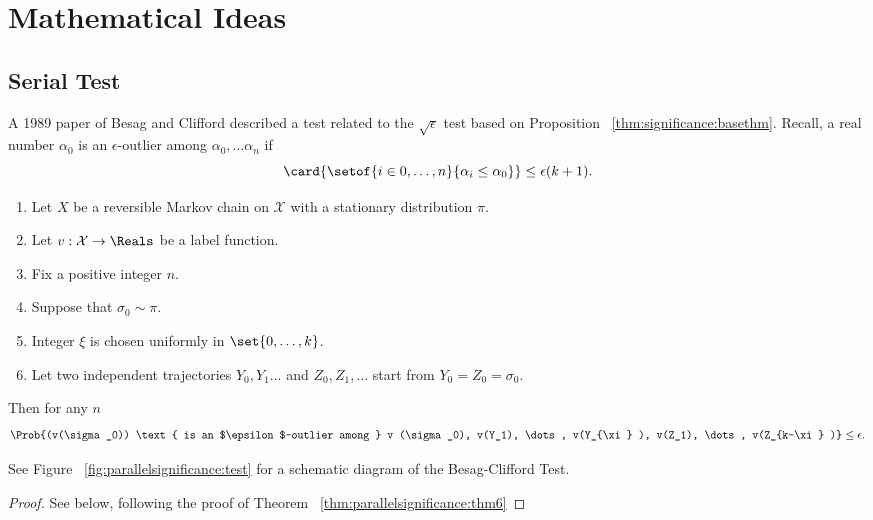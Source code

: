 \documentclass[12pt]{article}
\begin{document}
\section*{Mathematical Ideas}

\subsection*{Serial Test}

A 1989 paper of Besag and Clifford
\cite{besag89} described a test related to the \( \sqrt{\epsilon} \)
test based on Proposition~%
\ref{thm:significance:basethm}.  Recall, a real number \( \alpha_0 \) is
an \( \epsilon \)-outlier among \( \alpha_0, \dots \alpha_n \) if
\[
    \card{\setof{i \in 0, \dots, n}{ \alpha_i \le \alpha_0 }} \le
    \epsilon(k+1).
\]

\begin{theorem}
    \label{thm:parallelsignificance:bc1}
    \begin{enumerate}
        \item
            Let \( X \) be a reversible Markov chain on \( \mathcal{X} \)
            with a stationary distribution \( \pi \).
        \item
            Let \( v :  \mathcal{X} \to \Reals \) be a label function.
        \item
            Fix a positive integer \( n \).
        \item
            Suppose that \( \sigma_0 \sim \pi \).
        \item
            Integer \( \xi \) is chosen uniformly in \( \set{0,\dots, k}
            \).
        \item
            Let two independent trajectories \( Y_0 , Y_1 \dots \) and \(
            Z_0, Z_1, \dots \) start from \( Y_0 = Z_0 = \sigma_0 \).
    \end{enumerate}
    Then for any \( n \)
    \[
        \Prob{(v(\sigma_0)) \text{ is an $\epsilon$-outlier among } v
        (\sigma_0), v(Y_1), \dots, v(Y_{\xi} ), v(Z_1), \dots, v(Z_{k-\xi}
        )} \le \epsilon.
    \]
\end{theorem}

\begin{remark}
    See Figure~%
    \ref{fig:parallelsignificance:test} for a schematic diagram of the
    Besag-Clifford Test.
\end{remark}

\begin{proof}
    See below, following the proof of Theorem~%
    \ref{thm:parallelsignificance:thm6}
\end{proof}
\end{document}
